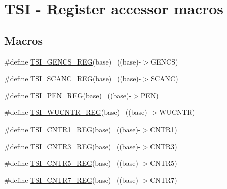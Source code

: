 \hypertarget{group___t_s_i___register___accessor___macros}{}\section{T\+SI -\/ Register accessor macros}
\label{group___t_s_i___register___accessor___macros}
\subsection*{Macros}
\begin{DoxyCompactItemize}
\item 
\#define \hyperlink{group___t_s_i___register___accessor___macros_gacb2292491464fa55b36996380b09077f}{T\+S\+I\+\_\+\+G\+E\+N\+C\+S\+\_\+\+R\+EG}(base)                                        ~((base)-\/$>$G\+E\+N\+CS)
\item 
\#define \hyperlink{group___t_s_i___register___accessor___macros_gaa04f34529d4fc762bc30470edc1d5f38}{T\+S\+I\+\_\+\+S\+C\+A\+N\+C\+\_\+\+R\+EG}(base)                                        ~((base)-\/$>$S\+C\+A\+NC)
\item 
\#define \hyperlink{group___t_s_i___register___accessor___macros_gaf538119a9d15bb7ecc599ef0c8dccec8}{T\+S\+I\+\_\+\+P\+E\+N\+\_\+\+R\+EG}(base)                                            ~((base)-\/$>$P\+EN)
\item 
\#define \hyperlink{group___t_s_i___register___accessor___macros_ga49c16fb23aea66326627e034f76787c8}{T\+S\+I\+\_\+\+W\+U\+C\+N\+T\+R\+\_\+\+R\+EG}(base)                                      ~((base)-\/$>$W\+U\+C\+N\+TR)
\item 
\#define \hyperlink{group___t_s_i___register___accessor___macros_ga7c64ae8bd21ec584c53351a1c55b6346}{T\+S\+I\+\_\+\+C\+N\+T\+R1\+\_\+\+R\+EG}(base)                                        ~((base)-\/$>$C\+N\+T\+R1)
\item 
\#define \hyperlink{group___t_s_i___register___accessor___macros_ga1abf4e67869018b5fda8466627fdf6ac}{T\+S\+I\+\_\+\+C\+N\+T\+R3\+\_\+\+R\+EG}(base)                                        ~((base)-\/$>$C\+N\+T\+R3)
\item 
\#define \hyperlink{group___t_s_i___register___accessor___macros_gae18562b4206a5154086131349befffe5}{T\+S\+I\+\_\+\+C\+N\+T\+R5\+\_\+\+R\+EG}(base)                                        ~((base)-\/$>$C\+N\+T\+R5)
\item 
\#define \hyperlink{group___t_s_i___register___accessor___macros_gac1490787aebce3053c85c5742138e611}{T\+S\+I\+\_\+\+C\+N\+T\+R7\+\_\+\+R\+EG}(base)                                        ~((base)-\/$>$C\+N\+T\+R7)

\end{DoxyCompactItemize}
